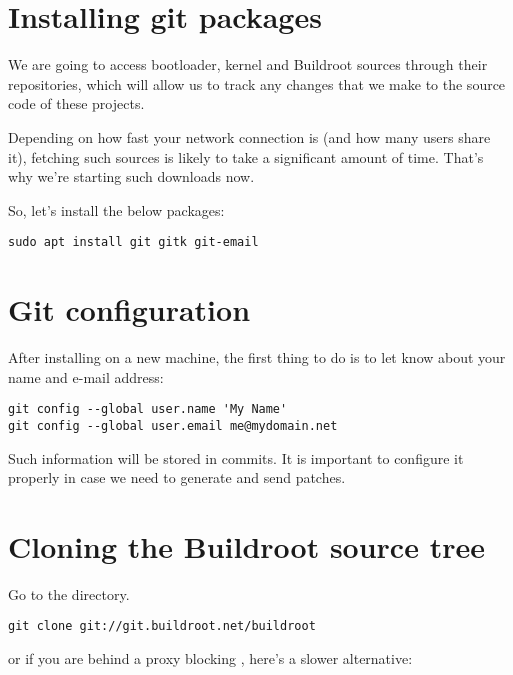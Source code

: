 
\section{Installing git packages}

We are going to access bootloader, kernel and Buildroot sources through
their  repositories, which will allow us to track any changes
that we make to the source code of these projects.

Depending on how fast your network connection is (and how many users
share it), fetching such sources is likely to take a significant amount
of time. That's why we're starting such downloads now.

So, let's install the below packages:

\begin{verbatim}
sudo apt install git gitk git-email
\end{verbatim}

\section{Git configuration}

After installing  on a new machine, the first thing to do is
to let  know about your name and e-mail address:

\begin{verbatim}
git config --global user.name 'My Name'
git config --global user.email me@mydomain.net
\end{verbatim}

Such information will be stored in commits. It is important
to configure it properly in case we need to generate and
send patches.

\section{Cloning the Buildroot source tree}

Go to the  directory.

\begin{verbatim}
git clone git://git.buildroot.net/buildroot
\end{verbatim}

or if you are behind a proxy blocking , here's a slower
alternative:

